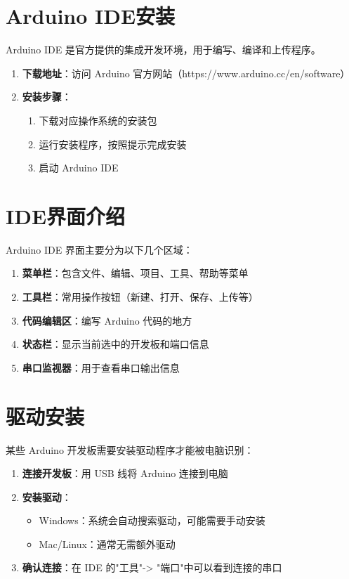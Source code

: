 \documentclass[12pt,UTF8]{ctexbook}
\begin{document}
\section{Arduino IDE安装}

Arduino IDE 是官方提供的集成开发环境，用于编写、编译和上传程序。

\begin{enumerate}
    \item \textbf{下载地址}：访问 Arduino 官方网站（https://www.arduino.cc/en/software）
    \item \textbf{安装步骤}：
    \begin{enumerate}
        \item 下载对应操作系统的安装包
        \item 运行安装程序，按照提示完成安装
        \item 启动 Arduino IDE
    \end{enumerate}
\end{enumerate}

\section{IDE界面介绍}

Arduino IDE 界面主要分为以下几个区域：

\begin{enumerate}
    \item \textbf{菜单栏}：包含文件、编辑、项目、工具、帮助等菜单
    \item \textbf{工具栏}：常用操作按钮（新建、打开、保存、上传等）
    \item \textbf{代码编辑区}：编写 Arduino 代码的地方
    \item \textbf{状态栏}：显示当前选中的开发板和端口信息
    \item \textbf{串口监视器}：用于查看串口输出信息
\end{enumerate}

\section{驱动安装}

某些 Arduino 开发板需要安装驱动程序才能被电脑识别：

\begin{enumerate}
    \item \textbf{连接开发板}：用 USB 线将 Arduino 连接到电脑
    \item \textbf{安装驱动}：
    \begin{itemize}
        \item Windows：系统会自动搜索驱动，可能需要手动安装
        \item Mac/Linux：通常无需额外驱动
    \end{itemize}
    \item \textbf{确认连接}：在 IDE 的"工具"-> "端口"中可以看到连接的串口
\end{enumerate}
\end{document}
